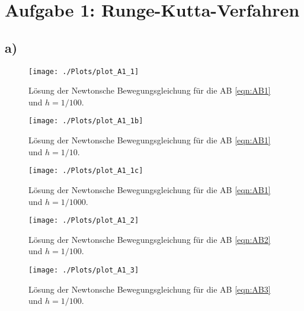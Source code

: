 \section*{Aufgabe 1: Runge-Kutta-Verfahren}

  \subsection*{a)}

    \begin{figure}
      \centering
      \texttt{[image: ./Plots/plot\_A1\_1]}
      \caption{Lösung der Newtonsche Bewegungsgleichung für die AB \ref{eqn:AB1} und $h=1/100$.}
      \label{fig:A11}
    \end{figure}
    \begin{figure}
      \centering
      \texttt{[image: ./Plots/plot\_A1\_1b]}
      \caption{Lösung der Newtonsche Bewegungsgleichung für die AB \ref{eqn:AB1} und $h=1/10$.}
      \label{fig:A11b}
    \end{figure}
    \begin{figure}
      \centering
      \texttt{[image: ./Plots/plot\_A1\_1c]}
      \caption{Lösung der Newtonsche Bewegungsgleichung für die AB \ref{eqn:AB1} und $h=1/1000$.}
      \label{fig:A11c}
    \end{figure}

    \begin{figure}
      \centering
      \texttt{[image: ./Plots/plot\_A1\_2]}
      \caption{Lösung der Newtonsche Bewegungsgleichung für die AB \ref{eqn:AB2} und $h=1/100$.}
      \label{fig:A12}
    \end{figure}
    \begin{figure}
      \centering
      \texttt{[image: ./Plots/plot\_A1\_3]}
      \caption{Lösung der Newtonsche Bewegungsgleichung für die AB \ref{eqn:AB3} und $h=1/100$.}
      \label{fig:A13}
    \end{figure}

